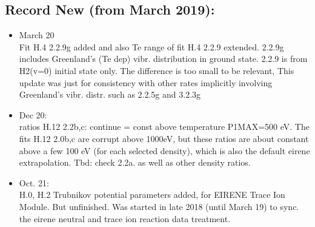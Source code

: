 \documentclass[12pt,dvipdfmx]{article}
\begin{document}
\subsection{Record New (from March 2019):}\label{record_new}
\begin{itemize}
\item March 20 \\
Fit H.4 2.2.9g added and also Te range of fit H.4 2.2.9 extended.
2.2.9g includes Greenland's (Te dep) vibr. distribution in ground state.
2.2.9 is from H2(v=0) initial state only. The difference is too small to be relevant,
This update was just for consistency with other rates implicitly involving Greenland's vibr. distr.
such as 2.2.5g and 3.2.3g
\item Dec 20: \\
ratios H.12  2.2b,c:  continue = const above temperature P1MAX=500 eV.
The fits H.12 2.0b,c are corrupt above 1000eV,
but these ratios are about constant above a few 100 eV (for each selected density), which is also the default eirene extrapolation.
Tbd: check 2.2a.  as well as other density ratios.
\item Oct. 21: \\
H.0, H.2 Trubnikov potential parameters added, for EIRENE Trace Ion Module.
But unfinished.
Was started in late 2018  (until March 19) to sync. the eirene neutral and trace ion reaction data treatment.



\end{itemize}
\end{document}
